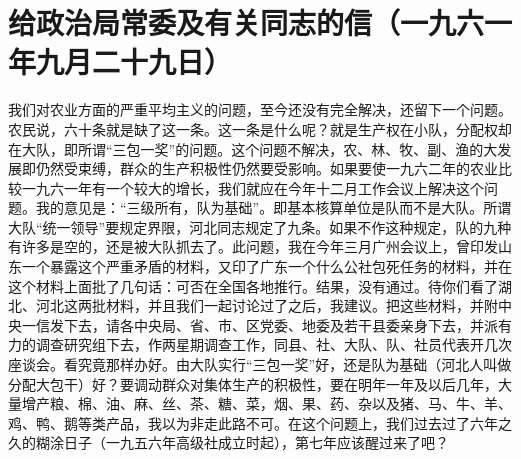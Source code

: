 \section{给政治局常委及有关同志的信（一九六一年九月二十九日）}


我们对农业方面的严重平均主义的问题，至今还没有完全解决，还留下一个问题。农民说，六十条就是缺了这一条。这一条是什么呢？就是生产权在小队，分配权却在大队，即所谓“三包一奖”的问题。这个问题不解决，农、林、牧、副、渔的大发展即仍然受束缚，群众的生产积极性仍然要受影响。如果要使一九六二年的农业比较一九六一年有一个较大的增长，我们就应在今年十二月工作会议上解决这个问题。我的意见是：“三级所有，队为基础”。即基本核算单位是队而不是大队。所谓大队“统一领导”要规定界限，河北同志规定了九条。如果不作这种规定，队的九种有许多是空的，还是被大队抓去了。此问题，我在今年三月广州会议上，曾印发山东一个暴露这个严重矛盾的材料，又印了广东一个什么公社包死任务的材料，并在这个材料上面批了几句话：可否在全国各地推行。结果，没有通过。待你们看了湖北、河北这两批材料，并且我们一起讨论过了之后，我建议。把这些材料，并附中央一信发下去，请各中央局、省、市、区党委、地委及若干县委亲身下去，并派有力的调查研究组下去，作两星期调查工作，同县、社、大队、队、社员代表开几次座谈会。看究竟那样办好。由大队实行“三包一奖”好，还是队为基础（河北人叫做分配大包干）好？要调动群众对集体生产的积极性，要在明年一年及以后几年，大量增产粮、棉、油、麻、丝、茶、糖、菜，烟、果、药、杂以及猪、马、牛、羊、鸡、鸭、鹅等类产品，我以为非走此路不可。在这个问题上，我们过去过了六年之久的糊涂日子（一九五六年高级社成立时起），第七年应该醒过来了吧？


